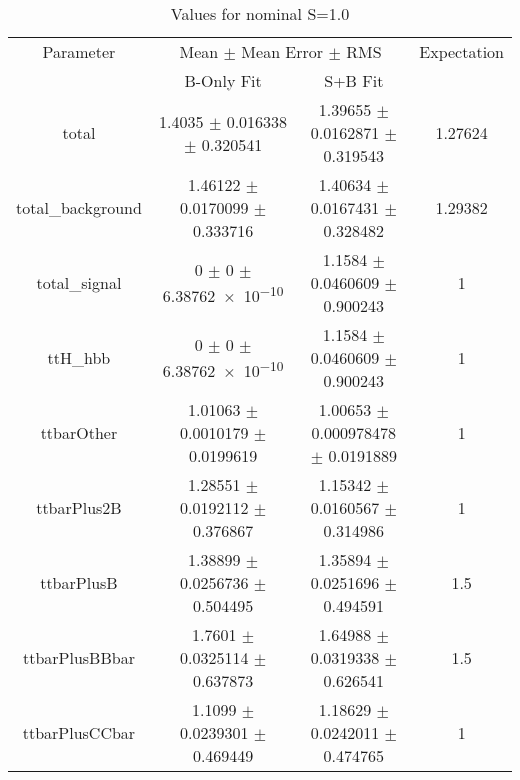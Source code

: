 \begin{table}
\centering
\caption{Values for nominal S=1.0}
\begin{tabular}{cccc}
\toprule
Parameter & \multicolumn{2}{c}{Mean $\pm$ Mean Error $\pm$ RMS} & Expectation\\
 & B-Only Fit & S+B Fit & \\
\midrule
total & \num{1.4035} $\pm$ \num{0.016338} $\pm$ \num{0.320541} & \num{1.39655} $\pm$ \num{0.0162871} $\pm$ \num{0.319543} & \num{1.27624}\\
total\_background & \num{1.46122} $\pm$ \num{0.0170099} $\pm$ \num{0.333716} & \num{1.40634} $\pm$ \num{0.0167431} $\pm$ \num{0.328482} & \num{1.29382}\\
total\_signal & \num{0} $\pm$ \num{0} $\pm$ \num{6.38762e-10} & \num{1.1584} $\pm$ \num{0.0460609} $\pm$ \num{0.900243} & \num{1}\\
ttH\_hbb & \num{0} $\pm$ \num{0} $\pm$ \num{6.38762e-10} & \num{1.1584} $\pm$ \num{0.0460609} $\pm$ \num{0.900243} & \num{1}\\
ttbarOther & \num{1.01063} $\pm$ \num{0.0010179} $\pm$ \num{0.0199619} & \num{1.00653} $\pm$ \num{0.000978478} $\pm$ \num{0.0191889} & \num{1}\\
ttbarPlus2B & \num{1.28551} $\pm$ \num{0.0192112} $\pm$ \num{0.376867} & \num{1.15342} $\pm$ \num{0.0160567} $\pm$ \num{0.314986} & \num{1}\\
ttbarPlusB & \num{1.38899} $\pm$ \num{0.0256736} $\pm$ \num{0.504495} & \num{1.35894} $\pm$ \num{0.0251696} $\pm$ \num{0.494591} & \num{1.5}\\
ttbarPlusBBbar & \num{1.7601} $\pm$ \num{0.0325114} $\pm$ \num{0.637873} & \num{1.64988} $\pm$ \num{0.0319338} $\pm$ \num{0.626541} & \num{1.5}\\
ttbarPlusCCbar & \num{1.1099} $\pm$ \num{0.0239301} $\pm$ \num{0.469449} & \num{1.18629} $\pm$ \num{0.0242011} $\pm$ \num{0.474765} & \num{1}\\
\bottomrule
\end{tabular}
\end{table}